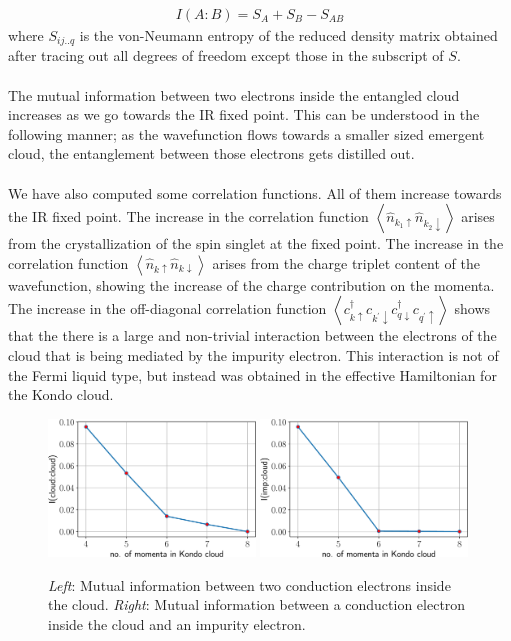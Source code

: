 \documentclass[twoside]{report}
\numberwithin{equation}{section}
\begin{document}
\begin{equation}\begin{aligned}
	I(A: B) = S_A + S_B - S_{AB}
\end{aligned}\end{equation}
where \(S_{ij..q}\) is the von-Neumann entropy of the reduced density matrix obtained after tracing out all degrees of freedom except those in the subscript of \(S\).
\\\\The mutual information between two electrons inside the entangled cloud increases as we go towards the IR fixed point. This can be understood in the following manner; as the wavefunction flows towards a smaller sized emergent cloud, the entanglement between those electrons gets distilled out.
\\\\We have also computed some correlation functions. All of them increase towards the IR fixed point. The increase in the correlation function \(\left<\hat n_{k_1 \uparrow} \hat n_{k_2 \downarrow} \right>\) arises from the crystallization of the spin singlet at the fixed point. The increase in the correlation function \(\left<\hat n_{k \uparrow} \hat n_{k \downarrow} \right>\) arises from the charge triplet content of the wavefunction, showing the increase of the charge contribution on the momenta. The increase in the off-diagonal correlation function \(\left< c^\dagger_{k \uparrow}c_{k^\prime \downarrow}c^\dagger_{q \downarrow}c_{q^\prime \uparrow}\right>\) shows that the there is a large and non-trivial interaction between the electrons of the cloud that is being mediated by the impurity electron. This interaction is not of the Fermi liquid type, but instead was obtained in the effective Hamiltonian for the Kondo cloud.
\begin{figure}[htpb!]
	\centering
	\includegraphics[width=0.49\textwidth]{../figures/mutI_ee.pdf}
	\includegraphics[width=0.49\textwidth]{../figures/mutI_d_e.pdf}
	\caption{\textit{Left}: Mutual information between two conduction electrons inside the cloud. \textit{Right}: Mutual information between a conduction electron inside the cloud and an impurity electron.}
	\label{mutI}
\end{figure}
\end{document}
